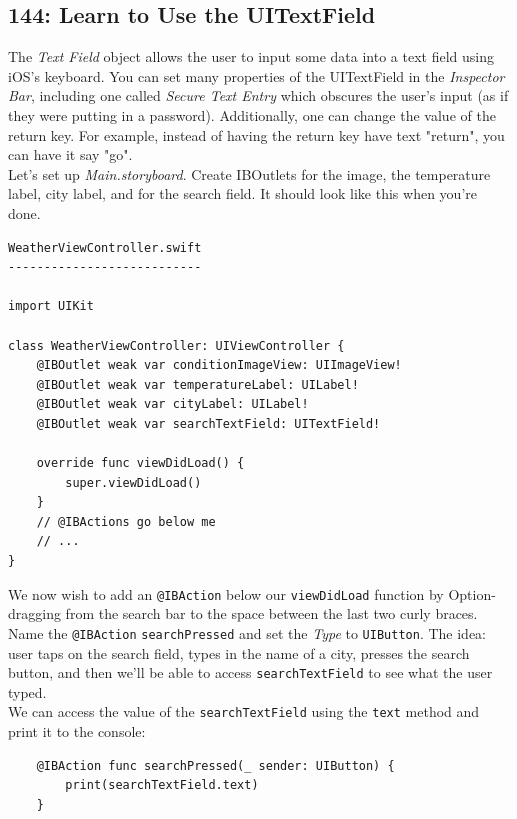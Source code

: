 \documentclass[12pt, letterpaper]{article}
\begin{document}
\subsection*{144: Learn to Use the UITextField}

The \emph{Text Field} object allows the user to input some data into a text field using iOS's keyboard. You can set many
properties of the UITextField in the \emph{Inspector Bar}, including one called \emph{Secure Text Entry} which obscures
the user's input (as if they were putting in a password). Additionally, one can change the value of the return key.
For example, instead of having the return key have text "return", you can have it say "go".\\

Let's set up \emph{Main.storyboard}. Create IBOutlets for the image, the temperature label, city label, and for the search
field. It should look like this when you're done.

\begin{verbatim}
WeatherViewController.swift
---------------------------

import UIKit

class WeatherViewController: UIViewController {
    @IBOutlet weak var conditionImageView: UIImageView!
    @IBOutlet weak var temperatureLabel: UILabel!
    @IBOutlet weak var cityLabel: UILabel!
    @IBOutlet weak var searchTextField: UITextField!

    override func viewDidLoad() {
        super.viewDidLoad()
    }
    // @IBActions go below me
    // ...
}
\end{verbatim}

We now wish to add an \verb+@IBAction+ below our \verb+viewDidLoad+ function by Option-dragging from the search bar to the space
between the last two curly braces. Name the \verb+@IBAction+ \verb+searchPressed+ and set the \emph{Type} to \verb+UIButton+.
The idea: user taps on the search field, types in the name of a city, presses the search button, and then we'll be able
to access \verb+searchTextField+ to see what the user typed. \\

We can access the value of the \verb+searchTextField+ using the \verb+text+ method and print it to the console:

\begin{verbatim}
    @IBAction func searchPressed(_ sender: UIButton) {
        print(searchTextField.text)
    }
\end{verbatim}
\end{document}
